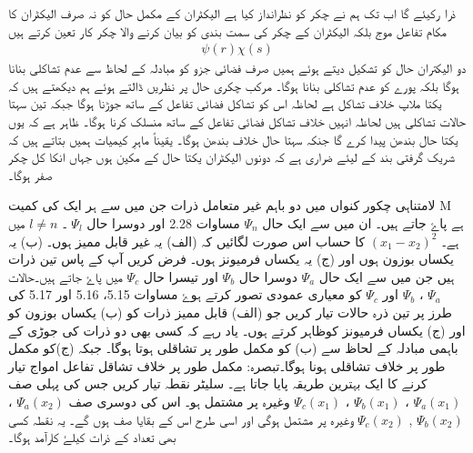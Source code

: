 ذرا رکیئے گا اب تک ہم نے چکر کو نظرانداز کیا ہے الیکٹران کے مکمل حال کو نہ صرف الیکٹران کا مکام تفاعل موج بلکہ الیکٹران کے  چکر کی سمت بندی کو بیان کرنے والا چکر کار تعین کرتے ہیں
\begin{align}
	\psi(r)\chi(s)
\end{align}
دو الیکتران حال کو تشکیل دیتے ہوئے ہمیں صرف فضائی جزو کو مبادلہ کے لحاظ سے عدم تشاکلی بنانا ہوگا بلکہ پورے کو عدم تشاکلی بنانا ہوگا۔ مرکب چکری حال  پر نظریں ڈالتے ہوئے ہم دیکھتے ہیں کہ یکتا ملاپ خلاف تشاکل ہے لحاظہ اس کو تشاکل فضائی تفاعل کے ساتھ جوڑنا ہوگا جبکہ تین سہتا حالات تشاکلی ہیں لحاظہ انہیں خلاف تشاکل فضائی تفاعل کے ساتھ منسلک کرنا ہوگا۔ ظاہر ہے کہ یوں یکتا حال بندھن پیدا کرے گا جنکہ سہتا حال خلاف بندھن ہوگا۔ یقیناً ماہرِ کیمیات ہمیں بتاتے ہیں کہ شریک گرفتی بند کے لیئے ضراری ہے کہ دونوں الیکٹران یکتا حال کے مکین ہوں جہاں انکا کل چکر صفر ہوگا۔


لامتناہی چکور کنواں میں دو باہم غیر متعامل ذرات جن میں سے ہر ایک کی کمیت M ہے پاۓ جاتے ہیں۔ ان میں سے ایک حال $ \Psi_{n} $ مساوات 2.28 اور دوسرا حال $  \Psi _{l} $ ۔ $ l\neq n $  میں ہے۔ $ (x_{1} - x_{2})^2 $ کا حساب اس صورت لگائیں کہ (الف) یہ غیر قابل ممیز ہوں۔ (ب) یہ یکساں بوزون ہوں اور (ج) یہ یکساں فرمیونز ہوں۔
فرض کریں آپ کے پاس تین ذرات ہیں جن میں سے ایک حال $ \Psi_{a} $ دوسرا حال $ \Psi_{b} $ اور تیسرا حال $ \Psi_{c} $ میں پاۓ جاتے ہیں۔حالات $ \Psi_{a} $ ، $ \Psi_{b} $ اور $ \Psi_{c} $ کو معیاری عمودی تصور کرتے ہوۓ مساوات 5.15، 5.16 اور 5.17 کی طرز پر تین ذرہ حالات تیار کریں جو (الف) قابل ممیز ذرات کو (ب) یکساں بوزون کو اور (ج) یکساں فرمیونز کوظاہر کرتے ہوں۔ یاد رہے کہ کسی بھی دو ذرات کی جوڑی کے باہمی مبادلہ کے لحاظ سے (ب) کو مکمل طور پر تشاقلی ہوتا ہوگا۔ جبکہ (ج)کو مکمل طور پر خلاف تشاقلی ہونا ہوگا۔تبصرہ: مکمل طور پر خلاف تشاقل تفاعل امواج تیار کرنے کا ایک بہترین طریقہ پایا جاتا ہے۔ سلیٹر نقطہ تیار کریں جس کی پہلی صف  $ \Psi_{a}(x_{1}) $ ، $ \Psi_{b}(x_{1}) $ ، $ \Psi_{c}(x_{1}) $ وغیرہ پر مشتمل ہو۔ اس کی دوسری صف $ \Psi_{a}(x_{2}) $ ، $ \Psi_{b}(x_{2}) $ , $ \Psi_{c}(x_{2}) $ وغیرہ پر مشتمل ہوگی اور اسی طرح اس کے بقایا صف ہوں گے۔ یہ نقطہ کسی بھی تعداد کے ذرات کیلۓ کارآمد ہوگا۔

